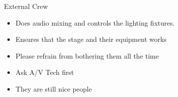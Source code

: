
\begin{frame}{External Crew}
	\begin{itemize}
		\item Does audio mixing and controls the lighting fixtures.
		\item Ensures that the stage and their equipment works
		\item Please refrain from bothering them all the time
        \item Ask A/V Tech first
		\item They are still nice people
	\end{itemize}
\end{frame}
